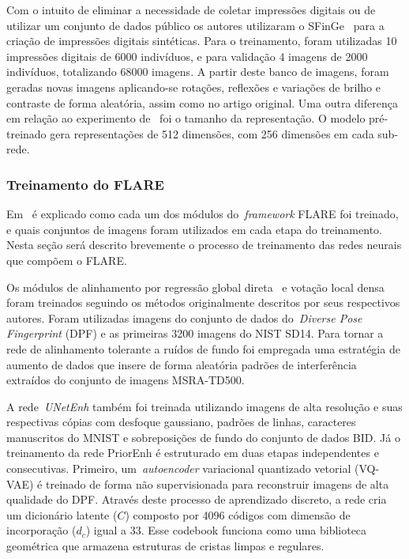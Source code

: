 Com o intuito de eliminar a necessidade de coletar impressões digitais ou de utilizar um conjunto de dados público os autores utilizaram o SFinGe~\cite{handbook_of_fp_recognition} para a criação de impressões digitais sintéticas. Para o treinamento, foram utilizadas 10 impressões digitais de 6000 indivíduos, e para validação 4 imagens de 2000 indivíduos, totalizando 68000 imagens. A partir deste banco de imagens, foram geradas novas imagens aplicando-se rotações, reflexões e variações de brilho e contraste de forma aleatória, assim como no artigo original. Uma outra diferença em relação ao experimento de~ foi o tamanho da representação. O modelo pré-treinado gera representações de 512 dimensões, com 256 dimensões em cada sub-rede.

\subsubsection{Treinamento do FLARE}\label{subsubsec:flare-training}

Em~\cite{flare} é explicado como cada um dos módulos do~\textit{framework} FLARE foi treinado, e quais conjuntos de imagens foram utilizados em cada etapa do treinamento. Nesta seção será descrito brevemente o processo de treinamento das redes neurais que compõem o FLARE.

Os módulos de alinhamento por regressão global direta~\cite{fingerprint_pose_via_regression} e votação local densa~\cite{fingerprint_pose_via_dense_voting} foram treinados seguindo os métodos originalmente descritos por seus respectivos autores. Foram utilizadas imagens do conjunto de dados do~\textit{Diverse Pose Fingerprint} (DPF) e as primeiras 3200 imagens do NIST SD14. Para tornar a rede de alinhamento tolerante a ruídos de fundo foi empregada uma estratégia de aumento de dados que insere de forma aleatória padrões de interferência extraídos do conjunto de imagens MSRA-TD500.

A rede~\textit{UNetEnh} também foi treinada utilizando imagens de alta resolução e suas respectivas cópias com desfoque gaussiano, padrões de linhas, caracteres manuscritos do MNIST e sobreposições de fundo do conjunto de dados BID. Já o treinamento da rede PriorEnh é estruturado em duas etapas independentes e consecutivas. Primeiro, um~\textit{autoencoder} variacional quantizado vetorial (VQ-VAE)\cite{vq-vae} é treinado de forma não supervisionada para reconstruir imagens de alta qualidade do DPF. Através deste processo de aprendizado discreto, a rede cria um dicionário latente ($C$) composto por 4096 códigos com dimensão de incorporação ($d_c$) igual a 33. Esse codebook funciona como uma biblioteca geométrica que armazena estruturas de cristas limpas e regulares.

